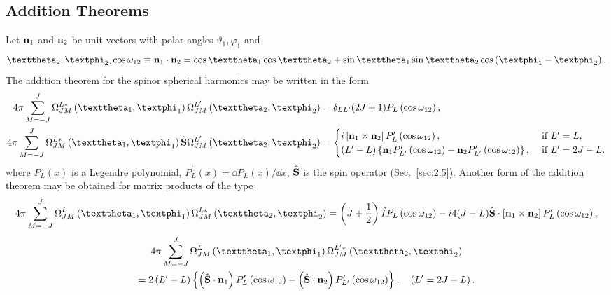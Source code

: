 \subsection{Addition Theorems}\label{sec:7.2.9}
Let $\mathbf{n}_{1}$ and $\mathbf{n}_{2}$ be unit vectors with polar angles $\vartheta_{1}, \varphi_{1}$ and \[\vartheta_{2}, \varphi_{2}, \cos \omega_{12} \equiv \vect{n}_{1} \cdot \vect{n}_{2}=\cos \vartheta_{1} \cos \vartheta_{2}+ \sin \vartheta_{1} \sin \vartheta_{2} \cos \left(\varphi_{1}-\varphi_{2}\right).\] The addition theorem for the spinor spherical harmonics may be written in the form
\begin{align}
4 \pi \sum_{M=-J}^{J} \Omega_{J M}^{L*}\left(\vartheta_{1}, \varphi_{1}\right) \Omega_{J M}^{L^{\prime}}\left(\vartheta_{2}, \varphi_{2}\right)&=\delta_{L L^{\prime}}(2 J+1) P_{L}\left(\cos \omega_{12}\right), \label{eq:7:2:42}\\
4 \pi \sum_{M=-J}^{J} \Omega_{J M}^{L*}\left(\vartheta_{1}, \varphi_{1}\right) \hat{\vect{S}} \Omega_{J M}^{L^{\prime}}\left(\vartheta_{2}, \varphi_{2}\right)&= 
\begin{cases}i\left|\vect{n}_{1} \times \vect{n}_{2}\right| P_{L}^{\prime}\left(\cos \omega_{12}\right), & \text { if } L^{\prime}=L, \\
\left(L^{\prime}-L\right)\left\{\vect{n}_{1} P_{L^{\prime}}^{\prime}\left(\cos \omega_{12}\right)-\vect{n}_{2} P_{L^{\prime}}^{\prime}\left(\cos \omega_{12}\right)\right\}, & \text { if } L^{\prime}=2 J-L.\end{cases} \label{eq:7:2:43}
\end{align}
where $P_{L}(x)$ is a Legendre polynomial, $P_{L}^{\prime}(x)=\dd P_{L}(x) / \dd x$, $\widehat{\mathbf{S}}$ is the spin operator (Sec.~\ref{sec:2.5}). Another form of the addition theorem may be obtained for matrix products of the type
\begin{multline}
4 \pi \sum_{M=-J}^{J} \Omega_{J M}^{L}\left(\vartheta_{1}, \varphi_{1}\right) \Omega_{J M}^{L*}\left(\vartheta_{2}, \varphi_{2}\right) %
=\left(J+\frac{1}{2}\right) \hat{I} P_{L}\left(\cos \omega_{12}\right)-i 4(J-L) \hat{\vect{S}} \cdot\left[\vect{n}_{1} \times \vect{n}_{2}\right] P_{L}^{\prime}\left(\cos \omega_{12}\right),  \label{eq:7:2:44}
\end{multline}
\begin{multline}
4 \pi \sum_{M=-J}^{J} \Omega_{J M}^{L}\left(\vartheta_{1}, \varphi_{1}\right) \Omega_{J M}^{L^{\prime}*}\left(\vartheta_{2}, \varphi_{2}\right) \\
=2\left(L^{\prime}-L\right)\left\{\left(\hat{\vect{S}} \cdot \vect{n}_{1}\right) P_{L}^{\prime}\left(\cos \omega_{12}\right)-\left(\hat{\vect{S}} \cdot \vect{n}_{2}\right) P_{L^{\prime}}^{\prime}\left(\cos \omega_{12}\right)\right\}, \quad\left(L^{\prime}=2 J-L\right). \label{eq:7:2:45}
\end{multline}
